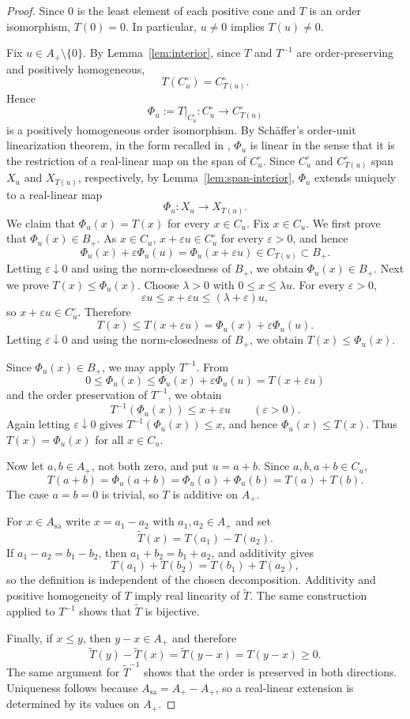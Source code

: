 \documentclass[12pt]{amsart}
\theoremstyle{remark}
\newcommand{\sa}{\mathrm{sa}}
\begin{document}
\begin{proof}
Since $0$ is the least element of each positive cone and $T$ is an
order isomorphism, $T(0)=0$.  In particular, $u\ne0$ implies
$T(u)\ne0$.

Fix $u\in A_+\setminus\{0\}$.  By Lemma~\ref{lem:interior}, since $T$ and $T^{-1}$ are 
order-preserving and positively homogeneous, 
\[
 T(C_u^\circ)=C_{T(u)}^\circ.
\]
Hence
\[
 \Phi_u:=T|_{C_u^\circ}:C_u^\circ\longrightarrow C_{T(u)}^\circ
\]
is a positively homogeneous order isomorphism.  By Sch\"affer's
order-unit linearization theorem, in the form recalled in
\cite[Theorem~5.2]{LGI}, $\Phi_u$ is linear in the sense that it is the
restriction of a real-linear map on the span of $C_u^\circ$.  Since
$C_u^\circ$ and $C_{T(u)}^\circ$ span $X_u$ and $X_{T(u)}$, respectively,
by Lemma~\ref{lem:span-interior}, $\Phi_u$ extends uniquely to a
real-linear map
\[
 \Phi_u:X_u\longrightarrow X_{T(u)}.
\]
We claim that $\Phi_u(x)=T(x)$ for every $x\in C_u$.  
Fix $x\in C_u$.  We first prove that $\Phi_u(x)\in B_+$. As $x\in C_u$, $x+\varepsilon u\in C_u^\circ$ for every $\varepsilon>0$, and hence
\[
        \Phi_u(x)+\varepsilon\Phi_u(u)
        =\Phi_u(x+\varepsilon u)\in C_{T(u)}\subset B_+.
\]
Letting $\varepsilon\downarrow0$ and using the norm-closedness of $B_{+}$, we obtain $\Phi_u(x)\in B_+$. 
Next we prove $T(x)\le \Phi_u(x)$. 
Choose $\lambda>0$ with $0\le x\le\lambda u$.  For every
$\varepsilon>0$,
\[
 \varepsilon u\le x+\varepsilon u
 \le(\lambda+\varepsilon)u,
\]
so $x+\varepsilon u\in C_u^\circ$.  Therefore
\[
 T(x)\le T(x+\varepsilon u)
 =\Phi_u(x)+\varepsilon\Phi_u(u).
\]
Letting $\varepsilon\downarrow0$ and using the norm-closedness of $B_{+}$, we obtain 
$T(x)\le\Phi_u(x)$.


Since $\Phi_u(x)\in B_+$, we may apply $T^{-1}$.
From
\[
    0\le\Phi_u(x)
    \leq\Phi_u(x)+\varepsilon\Phi_u(u)
    =T(x+\varepsilon u)
\]
and the order preservation of $T^{-1}$, we obtain
\[
    T^{-1}(\Phi_u(x))\leq x+\varepsilon u
    \qquad(\varepsilon>0).
\]
Again letting $\varepsilon\downarrow0$ gives
$T^{-1}(\Phi_u(x))\le x$, and hence $\Phi_u(x)\le T(x)$.  Thus $T(x)=\Phi_u(x)$ for all $x\in C_u$.

Now let $a,b\in A_+$, not both zero, and put $u=a+b$.  Since
$a,b,a+b\in C_u$,
\[
 T(a+b)=\Phi_u(a+b)=\Phi_u(a)+\Phi_u(b)=T(a)+T(b).
\]
The case $a=b=0$ is trivial, so $T$ is additive on $A_+$.

For $x\in A_{\sa}$ write $x=a_1-a_2$ with $a_1,a_2\in A_+$ and set
\[
 \widetilde T(x)=T(a_1)-T(a_2).
\]
If $a_1-a_2=b_1-b_2$, then $a_1+b_2=b_1+a_2$, and additivity gives
\[
 T(a_1)+T(b_2)=T(b_1)+T(a_2),
\]
so the definition is independent of the chosen decomposition.
Additivity and positive homogeneity of $T$ imply real linearity of
$\widetilde T$.  The same construction applied to $T^{-1}$ shows that
$\widetilde T$ is bijective.

Finally, if $x\le y$, then $y-x\in A_+$ and therefore
\[
 \widetilde T(y)-\widetilde T(x)
 =\widetilde T(y-x)=T(y-x)\ge0.
\]
The same argument for $\widetilde T^{-1}$ shows that the order is
preserved in both directions.  Uniqueness follows because
$A_{\sa}=A_+-A_+$, so a real-linear extension is determined by its
values on $A_+$.
\end{proof}
\end{document}
